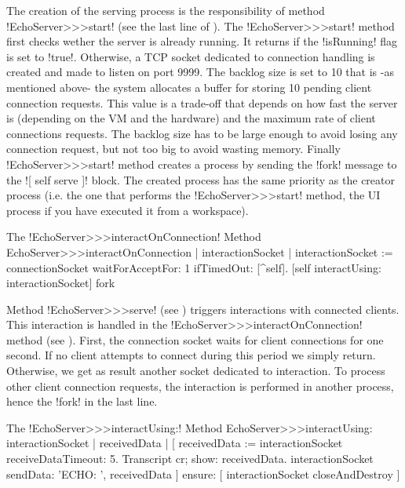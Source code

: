 \documentclass[a4paper,10pt,twoside]{book}
\begin{document}
The creation of the serving process is the responsibility of method \ct!EchoServer>>>start! (see the last line of ).
The \ct!EchoServer>>>start! method first checks wether the server is already running.
It returns if the \ct!isRunning! flag is set to \ct!true!.
Otherwise, a TCP socket dedicated to connection handling is created and made to listen on port 9999.
The backlog size is set to 10 that is -as mentioned above- the system allocates a buffer for storing 10 pending client connection requests.
This value is a trade-off that depends on how fast the server is (depending on the VM and the hardware) and the maximum rate of client connections requests.
The backlog size has to be large enough to avoid losing any connection request, but not too big to avoid wasting memory.
Finally \ct!EchoServer>>>start! method creates a process by sending the \ct!fork! message to the \ct![ self serve ]! block.
The created process has the same priority as the creator process (i.e. the one that performs the \ct!EchoServer>>>start! method, the UI process if you have executed it from a workspace).


\begin{method}{The \ct!EchoServer>>>interactOnConnection! Method}
EchoServer>>>interactOnConnection
	| interactionSocket |
	interactionSocket := connectionSocket waitForAcceptFor: 1 ifTimedOut: [^self].
	[self interactUsing: interactionSocket] fork
\end{method}

Method \ct!EchoServer>>>serve! (see ) triggers interactions with connected clients.
This interaction is handled in the \ct!EchoServer>>>interactOnConnection! method (see ).
First, the connection socket waits for client connections for one second.
If no client attempts to connect during this period we simply return.
Otherwise, we get as result another socket dedicated to interaction.
To process other client connection requests, the interaction is performed in another process, hence the \ct!fork! in the last line.

\begin{method}{The \ct!EchoServer>>>interactUsing:! Method}
EchoServer>>>interactUsing: interactionSocket
	| receivedData |
	[ receivedData := interactionSocket receiveDataTimeout: 5.
	 Transcript cr; show: receivedData.
	 interactionSocket sendData: 'ECHO: ', receivedData
	] ensure: [
	 interactionSocket closeAndDestroy ]
\end{method}
\end{document}
